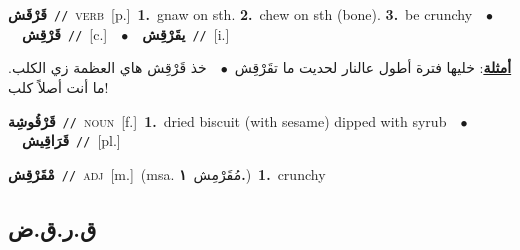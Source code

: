 \documentclass[10pt,a4paper,twoside]{article} %
\begin{document}
\begin{multicols}{2}
{\setlength\topsep{0pt}\textbf{\foreignlanguage{arabic}{قَرْقَش}}\ {\color{gray}\texttt{//}\color{black}}\ \textsc{verb}\ [p.]\ \textbf{1.}~gnaw on sth.  \textbf{2.}~chew on sth (bone).  \textbf{3.}~be crunchy\ \ $\bullet$\ \ \setlength\topsep{0pt}\textbf{\foreignlanguage{arabic}{قَرْقِش}}\ {\color{gray}\texttt{//}\color{black}}\ [c.]\ \ $\bullet$\ \ \setlength\topsep{0pt}\textbf{\foreignlanguage{arabic}{يقَرْقِش}}\ {\color{gray}\texttt{//}\color{black}}\ [i.]\  \begin{flushright}\color{gray}\foreignlanguage{arabic}{\textbf{\underline{\foreignlanguage{arabic}{أمثلة}}}: خليها فترة أطول عالنار لحديت ما تقَرْقِش\ $\bullet$\ \  خذ قَرْقِش هاي العظمة زي الكلب. ما أنت أصلاً كلب!}\end{flushright}\color{black}} \vspace{2mm}

{\setlength\topsep{0pt}\textbf{\foreignlanguage{arabic}{قَرْقُوشِة}}\ {\color{gray}\texttt{//}\color{black}}\ \textsc{noun}\ [f.]\ \textbf{1.}~dried biscuit (with sesame) dipped with syrub\ \ $\bullet$\ \ \setlength\topsep{0pt}\textbf{\foreignlanguage{arabic}{قَرَاقِيش}}\ {\color{gray}\texttt{//}\color{black}}\ [pl.]\ } \vspace{2mm}

{\setlength\topsep{0pt}\textbf{\foreignlanguage{arabic}{مْقَرْقِش}}\ {\color{gray}\texttt{//}\color{black}}\ \textsc{adj}\ [m.]\ \color{gray}(msa. \foreignlanguage{arabic}{مُقَرْمِش}~\foreignlanguage{arabic}{\textbf{١.}})\color{black}\ \textbf{1.}~crunchy\ } \vspace{2mm}

\vspace{-3mm}
\subsection*{\color{blue}\foreignlanguage{arabic}{ق.ر.ق.ض}\color{blue}{}} 


\end{multicols}
\end{document}

